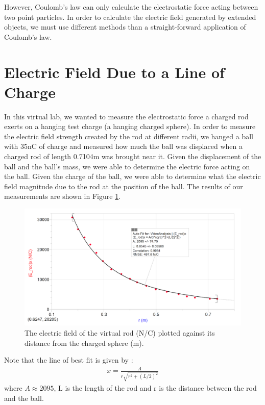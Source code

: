 \documentclass[oneside,12pt]{amsart}
\begin{document}
	\indent However, Coulomb's law can only calculate the electrostatic force acting between two point particles. In order to calculate the electric field generated by extended objects, we must use different methods than a straight-forward application of Coulomb's law.	
	
	\section{Electric Field Due to a Line of Charge}
	\indent In this virtual lab, we wanted to measure the electrostatic force a charged rod exerts on a hanging test charge (a hanging charged sphere). In order to measure the electric field strength created by the rod at different radii, we hanged a ball with 35nC of charge and measured how much the ball was displaced when a charged rod of length 0.7104m was brought near it. Given the displacement of the ball and the ball's mass, we were able to determine the electric force acting on the ball. Given the charge of the ball, we were able to determine what the electric field magnitude due to the rod at the position of the ball. The results of our measurements are shown in Figure \ref{Fld}.\\
	
	\begin{figure}[h]
		\includegraphics[width=\medgraph,scale=0.01]{FieldStrength.png}
		\caption{The electric field of the virtual rod (N/C) plotted against its distance from the charged sphere (m). 
		}
		\label{Fld}
	\end{figure}
	
	\indent Note that the line of best fit is given by :
	\begin{align*}
	x=\frac{A}{r\sqrt{r^2+(L/2)^2}	}
	\end{align*}
	where $A\approx 2095$, L is the length of the rod and r is the distance between the rod and the ball.
	
\end{document}
